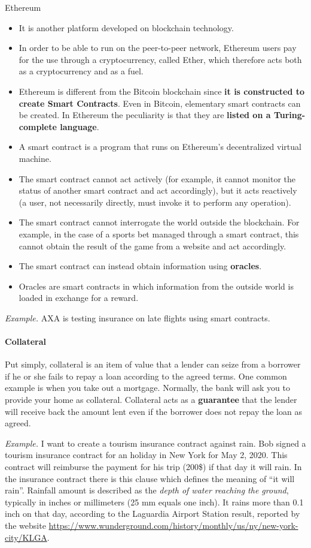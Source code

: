 Ethereum
\begin{itemize}
	\item It is another platform developed on blockchain technology.
	\item In order to be able to run on the peer-to-peer network, Ethereum users pay for the use through a cryptocurrency, called Ether, which therefore acts both as a cryptocurrency and as a fuel.
	\item Ethereum is different from the Bitcoin blockchain since \textbf{it is constructed to create Smart Contracts}. Even in Bitcoin, elementary smart contracts can be created. In Ethereum the peculiarity is that they are \textbf{listed on a Turing-complete language}.
	\item A smart contract is a program that runs on Ethereum's decentralized virtual machine.
	\item The smart contract cannot act actively (for example, it cannot monitor the status of another smart contract and act accordingly), but it acts reactively (a user, not necessarily directly, must invoke it to perform any operation).
	\item The smart contract cannot interrogate the world outside the blockchain. For example, in the case of a sports bet managed through a smart contract, this cannot obtain the result of the game from a website and act accordingly.
	\item The smart contract can instead obtain information using \textbf{oracles}.
	\item Oracles are smart contracts in which information from the outside world is loaded in exchange for a reward.
\end{itemize}

\emph{Example.} AXA is testing insurance on late flights using smart contracts.

\paragraph{Collateral} Put simply, collateral is an item of value that a lender can seize from a borrower if he or she fails to repay a loan according to the agreed terms. One common example is when you take out a mortgage. Normally, the bank will ask you to provide your home as collateral.
Collateral acts as a \textbf{guarantee} that the lender will receive back the amount lent even if the borrower does not repay the loan as agreed.

\emph{Example.} I want to create a tourism insurance contract against rain. Bob signed a tourism insurance contract for an holiday in New York for May 2, 2020. This contract will reimburse the payment for his trip (200\$) if that day it will rain. In the insurance contract there is this clause which defines the meaning of ``it will rain''. Rainfall amount is described as the \emph{depth of water reaching the ground}, typically in inches or millimeters (25 mm equals one inch). It rains more than 0.1 inch on that day, according to the Laguardia Airport Station result, reported by the website \url{https://www.wunderground.com/history/monthly/us/ny/new-york-city/KLGA}.

